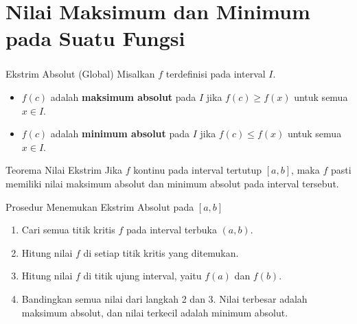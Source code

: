 \documentclass{../../kalkulus-ppt}
\begin{document}
\section{Nilai Maksimum dan Minimum pada Suatu Fungsi}
\begin{frame}
  \frametitle{\insertsection}
  \begin{definisi}{Ekstrim Absolut (Global)}
    Misalkan $f$ terdefinisi pada interval $I$.
    \begin{itemize}
      \item $f(c)$ adalah \textbf{maksimum absolut} pada $I$ jika $f(c) \ge f(x)$ untuk semua $x \in I$.
      \item $f(c)$ adalah \textbf{minimum absolut} pada $I$ jika $f(c) \le f(x)$ untuk semua $x \in I$.
    \end{itemize}
  \end{definisi}
  \pause
  \begin{teorema}{Teorema Nilai Ekstrim}
    Jika $f$ kontinu pada interval tertutup $[a,b]$, maka $f$ pasti memiliki nilai maksimum absolut dan minimum absolut pada interval tersebut.
  \end{teorema}
  \pause
  \begin{block}{Prosedur Menemukan Ekstrim Absolut pada $[a,b]$}
    \begin{enumerate}
      \item Cari semua titik kritis $f$ pada interval terbuka $(a,b)$.
      \item Hitung nilai $f$ di setiap titik kritis yang ditemukan.
      \item Hitung nilai $f$ di titik ujung interval, yaitu $f(a)$ dan $f(b)$.
      \item Bandingkan semua nilai dari langkah 2 dan 3. Nilai terbesar adalah maksimum absolut, dan nilai terkecil adalah minimum absolut.
    \end{enumerate}
  \end{block}
\end{frame}
\end{document}

